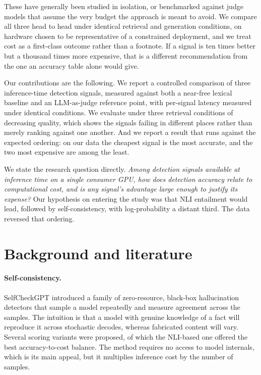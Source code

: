 \documentclass[11pt,a4paper]{article}
\begin{document}
These have generally been studied in isolation, or benchmarked against judge
models that assume the very budget the approach is meant to avoid. We compare
all three head to head under identical retrieval and generation conditions, on
hardware chosen to be representative of a constrained deployment, and we treat
cost as a first-class outcome rather than a footnote. If a signal is ten times
better but a thousand times more expensive, that is a different recommendation
from the one an accuracy table alone would give.

Our contributions are the following. We report a controlled comparison of three
inference-time detection signals, measured against both a near-free lexical
baseline and an LLM-as-judge reference point, with per-signal latency measured
under identical conditions. We evaluate under three retrieval conditions of
decreasing quality, which shows the signals failing in different places rather
than merely ranking against one another. And we report a result that runs
against the expected ordering: on our data the cheapest signal is the most
accurate, and the two most expensive are among the least.

We state the research question directly. \emph{Among detection signals available
at inference time on a single consumer GPU, how does detection accuracy relate to
computational cost, and is any signal's advantage large enough to justify its
expense?} Our hypothesis on entering the study was that NLI entailment would
lead, followed by self-consistency, with log-probability a distant third. The
data reversed that ordering.

\section{Background and literature}

\paragraph{Self-consistency.}
SelfCheckGPT \cite{manakul2023selfcheckgpt} introduced a family of zero-resource,
black-box hallucination detectors that sample a model repeatedly and measure
agreement across the samples. The intuition is that a model with genuine
knowledge of a fact will reproduce it across stochastic decodes, whereas
fabricated content will vary. Several scoring variants were proposed, of which
the NLI-based one offered the best accuracy-to-cost balance. The method requires
no access to model internals, which is its main appeal, but it multiplies
inference cost by the number of samples.
\end{document}
